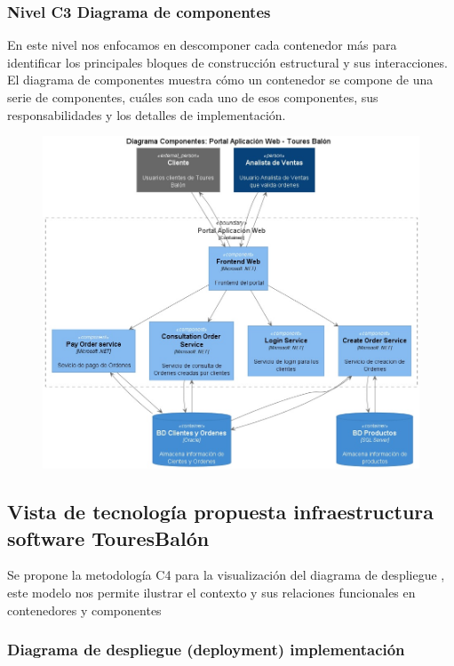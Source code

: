 \documentclass[12pt]{article}
\begin{document}
\subsubsection{Nivel C3 Diagrama de componentes}
En este nivel nos enfocamos en descomponer cada contenedor más para identificar los principales bloques de construcción estructural y sus interacciones. El diagrama de componentes muestra cómo un contenedor se compone de una serie de componentes, cuáles son cada uno de esos componentes, sus responsabilidades y los detalles de implementación.

\begin{figure}[ht]
\centering
\centering
\includegraphics[scale=0.4]{C3.jpeg}
\label{2}
\end{figure}
\FloatBarrier


\subsection{Vista de tecnología propuesta infraestructura software TouresBalón}

Se propone la metodología C4 para la visualización del diagrama de despliegue , este modelo nos permite ilustrar el contexto y sus relaciones funcionales en contenedores y componentes 

\subsubsection{Diagrama de despliegue (deployment) implementación}
\end{document}
